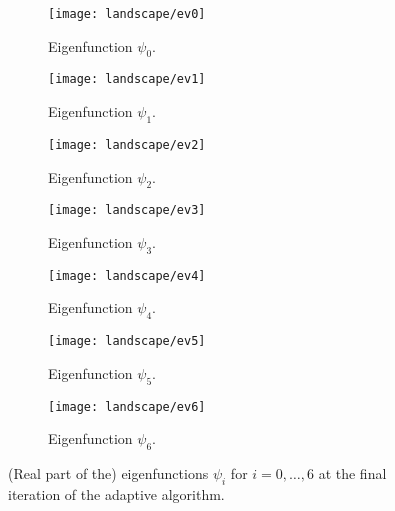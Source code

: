 \begin{figure}[htbp]
    \begin{subfigure}[t]{0.49\textwidth}
        \centering
        \texttt{[image: landscape/ev0]}
        \caption{Eigenfunction \(\psi_0\).}
        \label{fig:eigenfunction_0}
    \end{subfigure}
    \begin{subfigure}[t]{0.49\textwidth}
        \centering
        \texttt{[image: landscape/ev1]}
        \caption{Eigenfunction \(\psi_1\).}
        \label{fig:eigenfunction_1}
    \end{subfigure}
    \vspace{1cm}
    \begin{subfigure}[t]{0.49\textwidth}
        \centering
        \texttt{[image: landscape/ev2]}
        \caption{Eigenfunction \(\psi_2\).}
        \label{fig:eigenfunction_2}
    \end{subfigure}
    \begin{subfigure}[t]{0.49\textwidth}
        \centering
        \texttt{[image: landscape/ev3]}
        \caption{Eigenfunction \(\psi_3\).}
        \label{fig:eigenfunction_3}
    \end{subfigure}
    \vspace{1cm}
    \begin{subfigure}[t]{0.49\textwidth}
        \centering
        \texttt{[image: landscape/ev4]}
        \caption{Eigenfunction \(\psi_4\).}
        \label{fig:eigenfunction_4}
    \end{subfigure}
    \begin{subfigure}[t]{0.49\textwidth}
        \centering
        \texttt{[image: landscape/ev5]}
        \caption{Eigenfunction \(\psi_5\).}
        \label{fig:eigenfunction_5}
    \end{subfigure}
    \vspace{1cm}
    \begin{subfigure}[t]{0.49\textwidth}
        \centering
        \texttt{[image: landscape/ev6]}
        \caption{Eigenfunction \(\psi_6\).}
        \label{fig:eigenfunction_6}
    \end{subfigure}
    \caption{(Real part of the) eigenfunctions \(\psi_i\) for \(i = 0, \ldots, 6\) at the final iteration of the adaptive algorithm.}
\end{figure}


